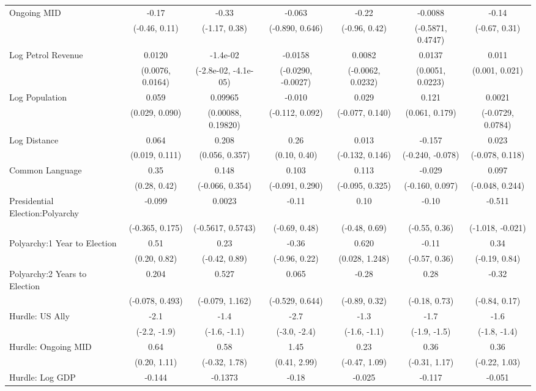 \begin{table}[H]
\begin{tabular}[t]{lcccccc}
Ongoing MID & -0.17 & -0.33 & -0.063 & -0.22 & -0.0088 & -0.14\\
 & (-0.46, 0.11) & (-1.17, 0.38) & (-0.890, 0.646) & (-0.96, 0.42) & (-0.5871, 0.4747) & (-0.67, 0.31)\\
Log Petrol Revenue & 0.0120 & -1.4e-02 & -0.0158 & 0.0082 & 0.0137 & 0.011\\
 & (0.0076, 0.0164) & (-2.8e-02, -4.1e-05) & (-0.0290, -0.0027) & (-0.0062, 0.0232) & (0.0051, 0.0223) & (0.001, 0.021)\\
Log Population & 0.059 & 0.09965 & -0.010 & 0.029 & 0.121 & 0.0021\\
 & (0.029, 0.090) & (0.00088, 0.19820) & (-0.112, 0.092) & (-0.077, 0.140) & (0.061, 0.179) & (-0.0729, 0.0784)\\
Log Distance & 0.064 & 0.208 & 0.26 & 0.013 & -0.157 & 0.023\\
 & (0.019, 0.111) & (0.056, 0.357) & (0.10, 0.40) & (-0.132, 0.146) & (-0.240, -0.078) & (-0.078, 0.118)\\
Common Language & 0.35 & 0.148 & 0.103 & 0.113 & -0.029 & 0.097\\
 & (0.28, 0.42) & (-0.066, 0.354) & (-0.091, 0.290) & (-0.095, 0.325) & (-0.160, 0.097) & (-0.048, 0.244)\\
Presidential Election:Polyarchy & -0.099 & 0.0023 & -0.11 & 0.10 & -0.10 & -0.511\\
 & (-0.365, 0.175) & (-0.5617, 0.5743) & (-0.69, 0.48) & (-0.48, 0.69) & (-0.55, 0.36) & (-1.018, -0.021)\\
Polyarchy:1 Year to Election & 0.51 & 0.23 & -0.36 & 0.620 & -0.11 & 0.34\\
 & (0.20, 0.82) & (-0.42, 0.89) & (-0.96, 0.22) & (0.028, 1.248) & (-0.57, 0.36) & (-0.19, 0.84)\\
Polyarchy:2 Years to Election & 0.204 & 0.527 & 0.065 & -0.28 & 0.28 & -0.32\\
 & (-0.078, 0.493) & (-0.079, 1.162) & (-0.529, 0.644) & (-0.89, 0.32) & (-0.18, 0.73) & (-0.84, 0.17)\\
Hurdle: US Ally & -2.1 & -1.4 & -2.7 & -1.3 & -1.7 & -1.6\\
 & (-2.2, -1.9) & (-1.6, -1.1) & (-3.0, -2.4) & (-1.6, -1.1) & (-1.9, -1.5) & (-1.8, -1.4)\\
Hurdle: Ongoing MID & 0.64 & 0.58 & 1.45 & 0.23 & 0.36 & 0.36\\
 & (0.20, 1.11) & (-0.32, 1.78) & (0.41, 2.99) & (-0.47, 1.09) & (-0.31, 1.17) & (-0.22, 1.03)\\
Hurdle: Log GDP & -0.144 & -0.1373 & -0.18 & -0.025 & -0.117 & -0.051\\

\end{tabular}
\end{table}
